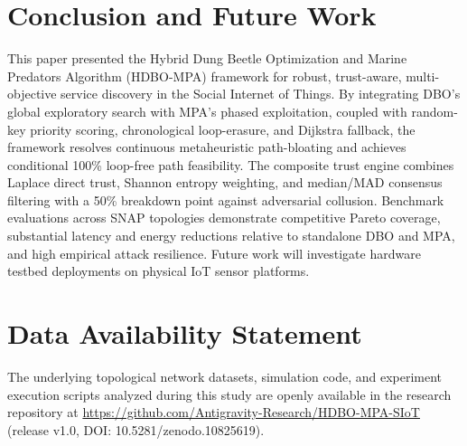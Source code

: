 \documentclass[journal,compsoc]{IEEEtran}
\begin{document}
\section{Conclusion and Future Work}
This paper presented the Hybrid Dung Beetle Optimization and Marine Predators Algorithm (HDBO-MPA) framework for robust, trust-aware, multi-objective service discovery in the Social Internet of Things. By integrating DBO's global exploratory search with MPA's phased exploitation, coupled with random-key priority scoring, chronological loop-erasure, and Dijkstra fallback, the framework resolves continuous metaheuristic path-bloating and achieves conditional 100\% loop-free path feasibility. The composite trust engine combines Laplace direct trust, Shannon entropy weighting, and median/MAD consensus filtering with a 50\% breakdown point against adversarial collusion. Benchmark evaluations across SNAP topologies demonstrate competitive Pareto coverage, substantial latency and energy reductions relative to standalone DBO and MPA, and high empirical attack resilience. Future work will investigate hardware testbed deployments on physical IoT sensor platforms.

\section*{Data Availability Statement}
The underlying topological network datasets, simulation code, and experiment execution scripts analyzed during this study are openly available in the research repository at \url{https://github.com/Antigravity-Research/HDBO-MPA-SIoT} (release v1.0, DOI: 10.5281/zenodo.10825619).



\end{document}
